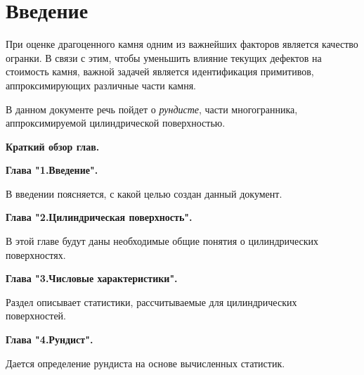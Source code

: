 \chapter{Введение}

При оценке драгоценного камня одним из важнейших факторов является качество огранки. В связи с этим, чтобы уменьшить влияние текущих дефектов на стоимость камня, важной задачей является идентификация примитивов, аппроксимирующих различные части камня. \vspace{0.5cm}

В данном документе речь пойдет о \textit{рундисте}, части многогранника, аппроксимируемой цилиндрической поверхностью.

\begin{figure}[h!]
\end{figure}\newpage

\begin{center}
	\textbf{ \Large{Краткий обзор глав.}}
\end{center}

\noindent \textbf{ \large{Глава "1.Введение".}} 

В введении поясняется, с какой целью создан данный документ.\vspace{1cm}

\noindent\textbf{ \large{Глава "2.Цилиндрическая поверхность".}} 

В этой главе будут даны необходимые общие понятия о цилиндрических поверхностях.\vspace{1cm}

\noindent \textbf{ \large{Глава "3.Числовые характеристики".}} 

Раздел описывает статистики, рассчитываемые для цилиндрических поверхностей.\vspace{1cm}

\noindent \textbf{ \large{Глава "4.Рундист".}}

Дается определение рундиста на основе вычисленных статистик.\newpage